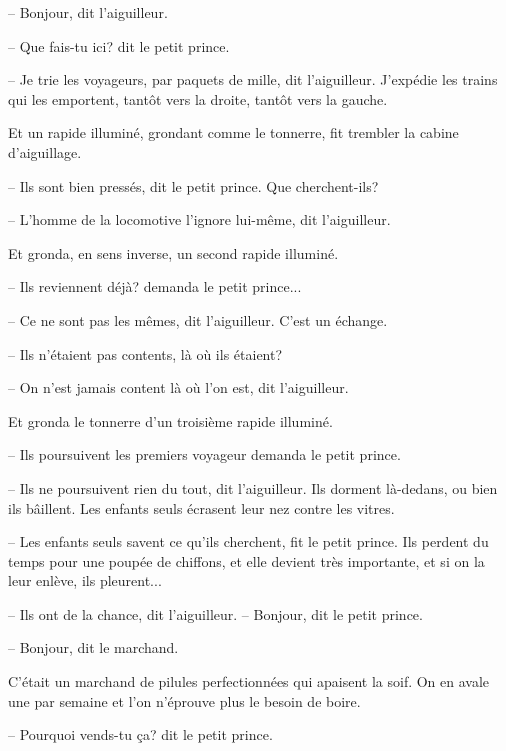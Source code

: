 \documentclass[a4paper]{report}
\begin{document}
-- Bonjour, dit l'aiguilleur.

-- Que fais-tu ici? dit le petit prince.

-- Je trie les voyageurs, par paquets de mille, dit l'aiguilleur. J'expédie les trains qui les emportent, tantôt vers la droite, tantôt vers la gauche.

Et un rapide illuminé, grondant comme le tonnerre, fit trembler la cabine d'aiguillage.

-- Ils sont bien pressés, dit le petit prince. Que cherchent-ils?

-- L'homme de la locomotive l'ignore lui-même, dit l'aiguilleur.

Et gronda, en sens inverse, un second rapide illuminé.

-- Ils reviennent déjà? demanda le petit prince...

-- Ce ne sont pas les mêmes, dit l'aiguilleur. C'est un échange.

-- Ils n'étaient pas contents, là où ils étaient?

-- On n'est jamais content là où l'on est, dit l'aiguilleur.

Et gronda le tonnerre d'un troisième rapide illuminé.

-- Ils poursuivent les premiers voyageur demanda le petit prince.

-- Ils ne poursuivent rien du tout, dit l'aiguilleur. Ils dorment là-dedans, ou bien ils bâillent. Les enfants seuls écrasent leur nez contre les vitres.

-- Les enfants seuls savent ce qu'ils cherchent, fit le petit prince. Ils perdent du temps pour une poupée de chiffons, et elle devient très importante, et si on la leur enlève, ils pleurent...

-- Ils ont de la chance, dit l'aiguilleur.
\parachapter{} %
-- Bonjour, dit le petit prince.

-- Bonjour, dit le marchand.

C'était un marchand de pilules perfectionnées qui apaisent la soif. On en avale une par semaine et l'on n'éprouve plus le besoin de boire.

-- Pourquoi vends-tu ça? dit le petit prince.
\end{document}
